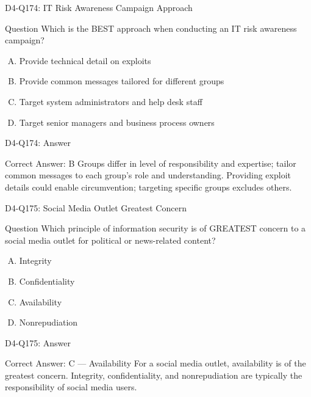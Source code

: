 \documentclass{beamer}
\begin{document}
	\begin{frame}{D4-Q174: IT Risk Awareness Campaign Approach}
		\begin{block}{Question}
			Which is the BEST approach when conducting an IT risk awareness campaign?
		\end{block}
		\begin{enumerate}[(A)]
			\item Provide technical detail on exploits
			\item Provide common messages tailored for different groups
			\item Target system administrators and help desk staff
			\item Target senior managers and business process owners
		\end{enumerate}
	\end{frame}
	\begin{frame}{D4-Q174: Answer}
		\begin{block}{Correct Answer: B}
			Groups differ in level of responsibility and expertise; tailor common messages to each group's role and understanding. Providing exploit details could enable circumvention; targeting specific groups excludes others.
		\end{block}
	\end{frame}
	
	\begin{frame}{D4-Q175: Social Media Outlet Greatest Concern}
		\begin{block}{Question}
			Which principle of information security is of GREATEST concern to a social media outlet for political or news-related content?
		\end{block}
		\begin{enumerate}[(A)]
			\item Integrity
			\item Confidentiality
			\item Availability
			\item Nonrepudiation
		\end{enumerate}
	\end{frame}
	\begin{frame}{D4-Q175: Answer}
		\begin{block}{Correct Answer: C --- Availability}
			For a social media outlet, availability is of the greatest concern. Integrity, confidentiality, and nonrepudiation are typically the responsibility of social media users.
		\end{block}
	\end{frame}
	
\end{document}
